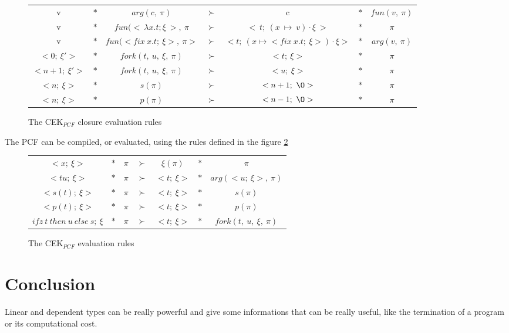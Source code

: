 \documentclass[a4paper,12pt]{article}
\begin{document}
\begin{figure}[!ht]
  \begin{center}
    \begin{tabular}{|c c c c c c c|}
      \hline
      v & $*$ & $arg(c,~\pi)$ & $\succ$ & c & $*$ & $fun(v,~\pi)$ \\
      v & $*$ & $fun(<~\lambda x.t;\xi~>,~\pi$ & $\succ$ &
      $<~t;~(x~\mapsto~v)\cdot \xi~>$ 
      & $*$ & $\pi$ \\
      v & $*$ & $fun(<fix~x.t;~\xi>,~\pi>$ & $\succ$ &
      $<t;~(x\mapsto <fix~x.t;~\xi>) \cdot \xi>$ & $*$ & $arg(v,~\pi)$ \\
      $<0;~\xi'>$ & $*$ & $fork(t,~u,~\xi,~\pi)$ & $\succ$ &
      $<t;~\xi>$ & $*$ & $\pi$ \\
      $<n+1;~\xi'>$ & $*$ & $fork(t,~u,~\xi,~\pi)$ & $\succ$ &
      $<u;~\xi>$ & $*$ & $\pi$ \\
      $<n;~\xi>$ & $*$ & $s(\pi)$ & $\succ$ &
      $<n+1;~\O>$ & $*$ & $\pi$ \\
      $<n;~\xi>$ & $*$ & $p(\pi)$ & $\succ$ &
      $<n-1;~\O>$ & $*$ & $\pi$ \\
      \hline
    \end{tabular}
  \end{center}
  \caption{The CEK$_{PCF}$ closure evaluation rules}
  \label{cek-eval-closure}
\end{figure}


The PCF can be compiled, or evaluated, using the rules defined in the figure \ref{cek-eval-rules}

\begin{figure}[!ht]
  \begin{center}
    \begin{tabular}{|c c c c c c c|}
      \hline
      $<x;~\xi>$ & $*$ & $\pi$ & $\succ$ & $\xi(\pi)$ & $*$ & $\pi$ \\
      $<tu;~\xi>$ & $*$ & $\pi$ & $\succ$ & $<t;~\xi>$ & $*$ & 
      $arg(<u;~\xi>,~\pi)$ \\
      $<s(t);~\xi>$ & $*$ & $\pi$ & $\succ$ & $<t;~\xi>$ & $*$ & 
      $s(\pi)$ \\
      $<p(t);~\xi>$ & $*$ & $\pi$ & $\succ$ & $<t;~\xi>$ & $*$ & 
      $p(\pi)$ \\
      $ifz~t~then~u~else~s;~\xi$ 
      & $*$ & $\pi$ & $\succ$ & $<t;~\xi>$ & $*$ & 
      $fork(t,~u,~\xi,~\pi)$ \\
      \hline
    \end{tabular}
  \end{center}
  \caption{The CEK$_{PCF}$ evaluation rules}
  \label{cek-eval-rules}
\end{figure}

\section{Conclusion}

Linear and dependent types can be really powerful and give some informations
that can be really useful, like the termination of a program or its
computational cost.




\end{document}

